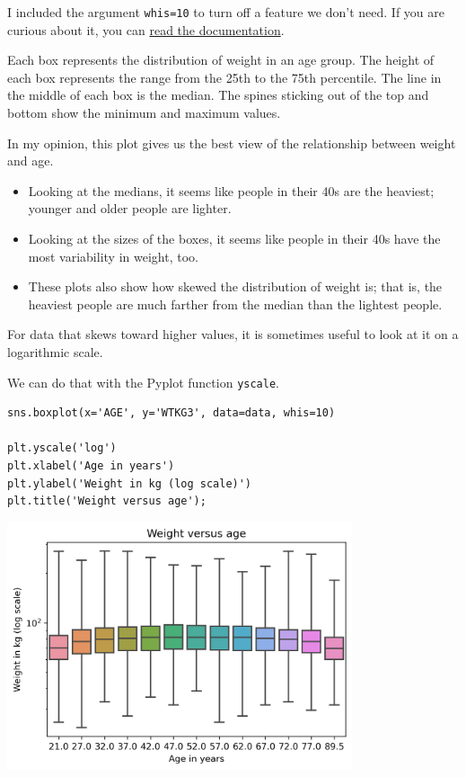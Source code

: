I included the argument \passthrough{\lstinline!whis=10!} to turn off a
feature we don't need. If you are curious about it, you can
\href{https://seaborn.pydata.org/generated/seaborn.boxplot.html}{read
the documentation}.

Each box represents the distribution of weight in an age group. The
height of each box represents the range from the 25th to the 75th
percentile. The line in the middle of each box is the median. The spines
sticking out of the top and bottom show the minimum and maximum values.

In my opinion, this plot gives us the best view of the relationship
between weight and age.

\begin{itemize}
\item
  Looking at the medians, it seems like people in their 40s are the
  heaviest; younger and older people are lighter.
\item
  Looking at the sizes of the boxes, it seems like people in their 40s
  have the most variability in weight, too.
\item
  These plots also show how skewed the distribution of weight is; that
  is, the heaviest people are much farther from the median than the
  lightest people.
\end{itemize}

For data that skews toward higher values, it is sometimes useful to look
at it on a logarithmic scale.

We can do that with the Pyplot function
\passthrough{\lstinline!yscale!}.

\begin{lstlisting}[]
sns.boxplot(x='AGE', y='WTKG3', data=data, whis=10)

plt.yscale('log')
plt.xlabel('Age in years')
plt.ylabel('Weight in kg (log scale)')
plt.title('Weight versus age');
\end{lstlisting}

\begin{center}
\includegraphics[width=4in]{09_relationships_files/09_relationships_47_0.png}
\end{center}

